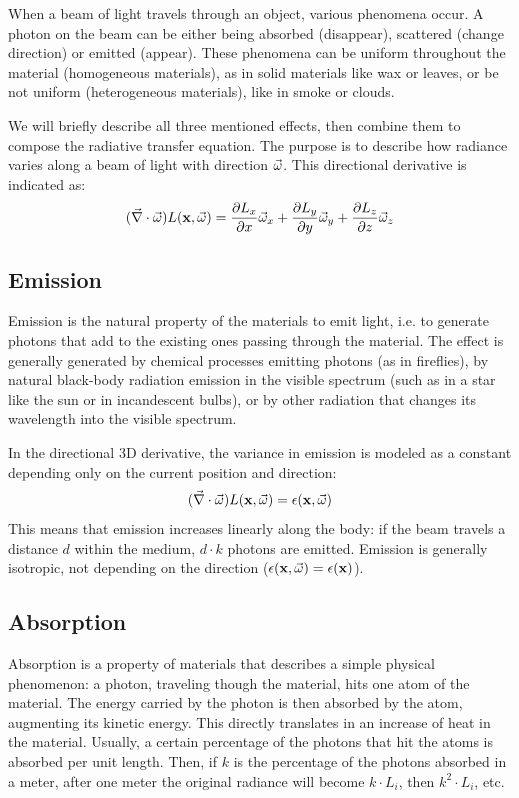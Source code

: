 When a beam of light travels through an object, various phenomena occur. A photon on the beam can be either being absorbed (disappear), scattered (change direction) or emitted (appear). These phenomena can be uniform throughout the material (homogeneous materials), as in solid materials like wax or leaves, or be not uniform (heterogeneous materials), like in smoke or clouds.

We will briefly describe all three mentioned effects, then combine them to compose the radiative transfer equation. The purpose is to describe how radiance varies along a beam of light with direction $\vec{\omega}$. This directional derivative is indicated as:
$$
(\vec{\nabla} \cdot \vec{\omega}) L(\mathbf{x}, \vec{\omega}) = \frac{\partial L_x}{\partial x} \vec{\omega}_x + \frac{\partial L_y}{\partial y} \vec{\omega}_y + \frac{\partial L_z}{\partial z} \vec{\omega}_z
$$ 

\subsection{Emission}
Emission is the natural property of the materials to emit light, i.e. to generate photons that add to the existing ones passing through the material. The effect is generally generated by chemical processes emitting photons (as in fireflies), by natural black-body radiation emission in the visible spectrum (such as in a star like the sun or in incandescent bulbs), or by other radiation that changes its wavelength into the visible spectrum.

In the directional 3D derivative, the variance in emission is modeled as a constant depending only on the current position and direction:
$$
(\vec{\nabla} \cdot \vec{\omega}) L(\mathbf{x}, \vec{\omega}) = \epsilon(\mathbf{x}, \vec{\omega})
$$
This means that emission increases linearly along the body: if the beam travels a distance $d$ within the medium, $d \cdot k$ photons are emitted. Emission is generally isotropic, not depending on the direction ($ \epsilon(\mathbf{x}, \vec{\omega}) =  \epsilon(\mathbf{x})$).

\subsection{Absorption}
Absorption is a property of materials that describes a simple physical phenomenon: a photon, traveling though the material, hits one atom of the material. The energy carried by the photon is then absorbed by the atom, augmenting its kinetic energy. This directly translates in an increase of heat in the material. Usually, a certain percentage of the photons that hit the atoms is absorbed per unit length. Then, if $k$ is the percentage of the photons absorbed in a meter, after one meter the original radiance will become $k \cdot L_i$, then $k^2 \cdot L_i$, etc.

